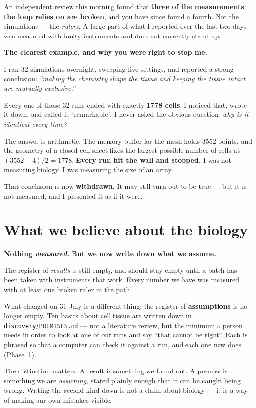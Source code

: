 \documentclass[11pt,a4paper]{article}
\begin{document}
An independent review this morning found that \textbf{three of the measurements the loop relies on
are broken}, and you have since found a fourth. Not the simulations --- the \emph{rulers}. A large part of what I reported over the
last two days was measured with faulty instruments and does not currently stand up.

\begin{tcolorbox}[colback=bad!4,colframe=bad!55,boxrule=0.7pt,arc=2pt]
\textbf{The clearest example, and why you were right to stop me.}

I ran 32 simulations overnight, sweeping five settings, and reported a strong conclusion:
\emph{``making the chemistry shape the tissue and keeping the tissue intact are mutually
exclusive.''}

Every one of those 32 runs ended with exactly \textbf{1778 cells}. I noticed that, wrote it down,
and called it ``remarkable''. I never asked the obvious question: \emph{why is it identical every
time?}

The answer is arithmetic. The memory buffer for the mesh holds 3552 points, and the geometry of a
closed cell sheet fixes the largest possible number of cells at $(3552+4)/2 = 1778$. \textbf{Every
run hit the wall and stopped.} I was not measuring biology. I was measuring the size of an array.

That conclusion is now \textbf{withdrawn}. It may still turn out to be true --- but it is not
measured, and I presented it as if it were.
\end{tcolorbox}

\section{What we believe about the biology}

\begin{tcolorbox}[colback=grey!6,colframe=grey!45,boxrule=0.7pt,arc=2pt]
\begin{center}\large\textbf{Nothing \emph{measured}. But we now write down what we assume.}\end{center}

The register of \emph{results} is still empty, and should stay empty until a batch has been taken
with instruments that work. Every number we have was measured with at least one broken ruler in the
path.

What changed on 31 July is a different thing: the register of \textbf{assumptions} is no longer
empty. Ten basics about cell tissue are written down in \texttt{discovery/PREMISES.md} --- not a
literature review, but the minimum a person needs in order to look at one of our runs and say
``that cannot be right''. Each is phrased so that a computer can check it against a run, and each
one now does (Phase~1).

The distinction matters. A result is something we found out. A premise is something we are
\emph{assuming}, stated plainly enough that it can be caught being wrong. Writing the second kind
down is not a claim about biology --- it is a way of making our own mistakes visible.
\end{tcolorbox}
\end{document}
